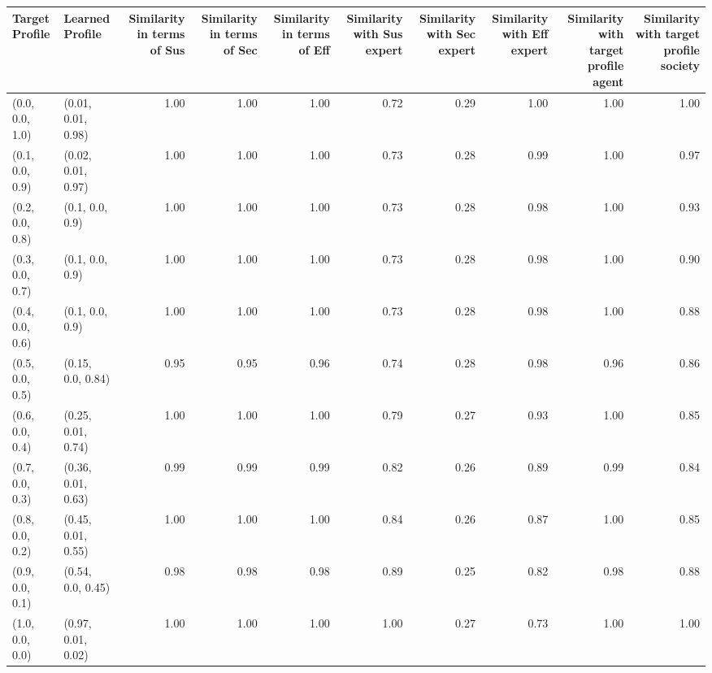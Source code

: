 \begin{tabular}{llrrrrrrrr}
\toprule
Target Profile & Learned Profile & Similarity in terms of Sus & Similarity in terms of Sec & Similarity in terms of Eff & Similarity with Sus expert & Similarity with Sec expert & Similarity with Eff expert & Similarity with target profile agent & Similarity with target profile society \\
\midrule
(0.0, 0.0, 1.0) & (0.01, 0.01, 0.98) & 1.00 & 1.00 & 1.00 & 0.72 & 0.29 & 1.00 & 1.00 & 1.00 \\
(0.1, 0.0, 0.9) & (0.02, 0.01, 0.97) & 1.00 & 1.00 & 1.00 & 0.73 & 0.28 & 0.99 & 1.00 & 0.97 \\
(0.2, 0.0, 0.8) & (0.1, 0.0, 0.9) & 1.00 & 1.00 & 1.00 & 0.73 & 0.28 & 0.98 & 1.00 & 0.93 \\
(0.3, 0.0, 0.7) & (0.1, 0.0, 0.9) & 1.00 & 1.00 & 1.00 & 0.73 & 0.28 & 0.98 & 1.00 & 0.90 \\
(0.4, 0.0, 0.6) & (0.1, 0.0, 0.9) & 1.00 & 1.00 & 1.00 & 0.73 & 0.28 & 0.98 & 1.00 & 0.88 \\
(0.5, 0.0, 0.5) & (0.15, 0.0, 0.84) & 0.95 & 0.95 & 0.96 & 0.74 & 0.28 & 0.98 & 0.96 & 0.86 \\
(0.6, 0.0, 0.4) & (0.25, 0.01, 0.74) & 1.00 & 1.00 & 1.00 & 0.79 & 0.27 & 0.93 & 1.00 & 0.85 \\
(0.7, 0.0, 0.3) & (0.36, 0.01, 0.63) & 0.99 & 0.99 & 0.99 & 0.82 & 0.26 & 0.89 & 0.99 & 0.84 \\
(0.8, 0.0, 0.2) & (0.45, 0.01, 0.55) & 1.00 & 1.00 & 1.00 & 0.84 & 0.26 & 0.87 & 1.00 & 0.85 \\
(0.9, 0.0, 0.1) & (0.54, 0.0, 0.45) & 0.98 & 0.98 & 0.98 & 0.89 & 0.25 & 0.82 & 0.98 & 0.88 \\
(1.0, 0.0, 0.0) & (0.97, 0.01, 0.02) & 1.00 & 1.00 & 1.00 & 1.00 & 0.27 & 0.73 & 1.00 & 1.00 \\
\bottomrule
\end{tabular}
